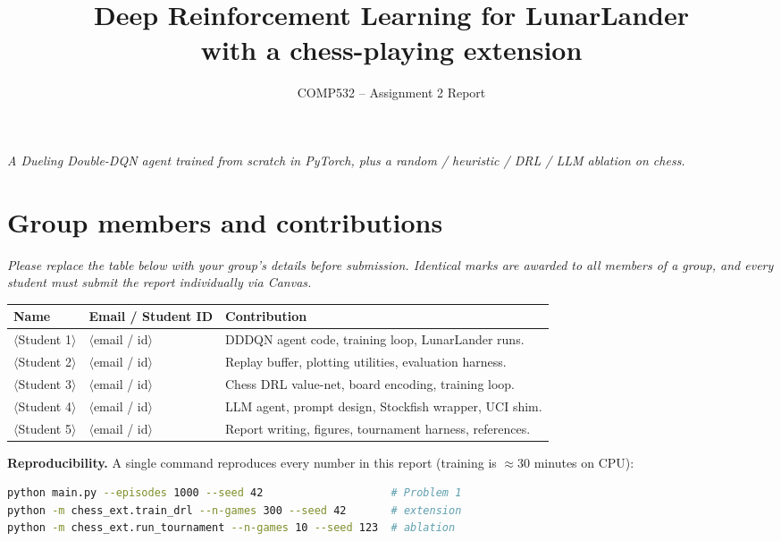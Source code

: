 \documentclass[11pt,a4paper]{article}
\title{\vspace{-1.5cm}\color{primary}
       \textbf{Deep Reinforcement Learning for LunarLander}\\[2pt]
       \large with a chess-playing extension}
\author{COMP532 -- Assignment 2 Report}
\date{}
\begin{document}
\maketitle\thispagestyle{fancy}
\vspace{-1cm}

\begin{center}
\textit{A Dueling Double-DQN agent trained from scratch in PyTorch, plus a
random / heuristic / DRL / LLM ablation on chess.}
\end{center}

\section*{Group members and contributions}
\noindent\textit{Please replace the table below with your group's
details before submission. Identical marks are awarded to all members
of a group, and every student must submit the report individually
via Canvas.}

\vspace{4pt}
\begin{center}
\small
\begin{tabular}{p{4cm}p{4cm}p{6cm}}
\toprule
\textbf{Name} & \textbf{Email / Student ID} & \textbf{Contribution} \\
\midrule
$\langle$Student 1$\rangle$ & $\langle$email / id$\rangle$ & DDDQN agent code, training loop, LunarLander runs.\\
$\langle$Student 2$\rangle$ & $\langle$email / id$\rangle$ & Replay buffer, plotting utilities, evaluation harness.\\
$\langle$Student 3$\rangle$ & $\langle$email / id$\rangle$ & Chess DRL value-net, board encoding, training loop.\\
$\langle$Student 4$\rangle$ & $\langle$email / id$\rangle$ & LLM agent, prompt design, Stockfish wrapper, UCI shim.\\
$\langle$Student 5$\rangle$ & $\langle$email / id$\rangle$ & Report writing, figures, tournament harness, references.\\
\bottomrule
\end{tabular}
\end{center}

\vspace{4pt}
\noindent\textbf{Reproducibility.} A single command reproduces every number in this
report (training is $\approx 30$ minutes on CPU):
\begin{lstlisting}[language=bash]
python main.py --episodes 1000 --seed 42                    # Problem 1
python -m chess_ext.train_drl --n-games 300 --seed 42       # extension
python -m chess_ext.run_tournament --n-games 10 --seed 123  # ablation
\end{lstlisting}
\end{document}
